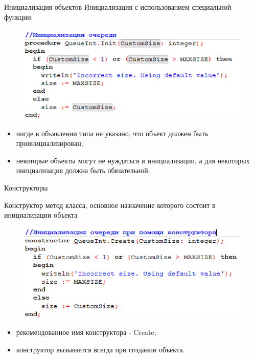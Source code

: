 \documentclass{beamer}
\begin{document}
\begin{frame}{Инициализация объектов}
Инициализация с использованием специальной функции:
\begin{figure}[h]
\centering
\includegraphics[scale=0.75]{images/lec05-pic03.png}
\end{figure}
\begin{itemize}
\item нигде в объявлении типа не указано, что объект должен быть проинициализирован;
\item некоторые объекты могут не нуждаться в инициализации, а для некоторых инициализация должна быть обязательной. 
\end{itemize}
\end{frame}

\begin{frame}{Конструкторы}
\begin{block}{Конструктор}
метод класса, основное назначение которого состоит в инициализации объекта
\end{block}

\begin{figure}[h]
\centering
\includegraphics[scale=0.6]{images/lec05-pic04.png}
\end{figure}
\begin{itemize}
\item рекомендованное имя конструктора - Create;
\item конструктор вызывается всегда при создании объекта. 
\end{itemize}
\end{frame}
\end{document}
